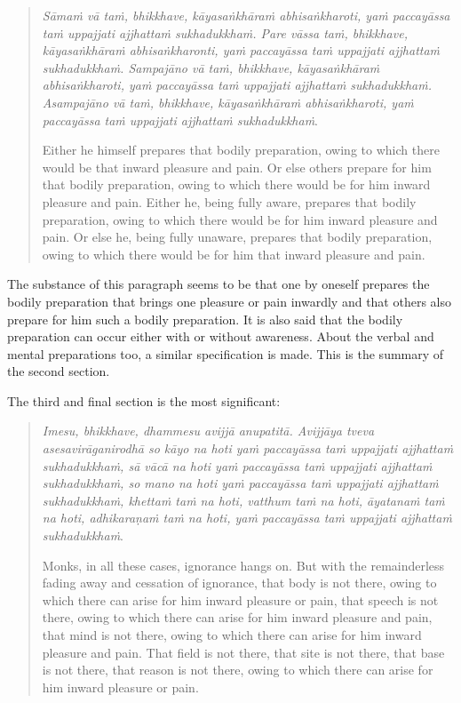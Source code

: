 \begin{quote}
\emph{Sāmaṁ vā taṁ, bhikkhave, kāyasaṅkhāraṁ abhisaṅkharoti, yaṁ paccayāssa taṁ uppajjati ajjhattaṁ sukhadukkhaṁ. Pare vāssa taṁ, bhikkhave, kāyasaṅkhāraṁ abhisaṅkharonti, yaṁ paccayāssa taṁ uppajjati ajjhattaṁ sukhadukkhaṁ. Sampajāno vā taṁ, bhikkhave, kāyasaṅkhāraṁ abhisaṅkharoti, yaṁ paccayāssa taṁ uppajjati ajjhattaṁ sukhadukkhaṁ. Asampajāno vā taṁ, bhikkhave, kāyasaṅkhāraṁ abhisaṅkharoti, yaṁ paccayāssa taṁ uppajjati ajjhattaṁ sukhadukkhaṁ}.

Either he himself prepares that bodily preparation, owing to which there would be that inward pleasure and pain. Or else others prepare for him that bodily preparation, owing to which there would be for him inward pleasure and pain. Either he, being fully aware, prepares that bodily preparation, owing to which there would be for him inward pleasure and pain. Or else he, being fully unaware, prepares that bodily preparation, owing to which there would be for him that inward pleasure and pain.
\end{quote}

The substance of this paragraph seems to be that one by oneself prepares the bodily preparation that brings one pleasure or pain inwardly and that others also prepare for him such a bodily preparation. It is also said that the bodily preparation can occur either with or without awareness. About the verbal and mental preparations too, a similar specification is made. This is the summary of the second section.

The third and final section is the most significant:

\begin{quote}
\emph{Imesu, bhikkhave, dhammesu avijjā anupatitā. Avijjāya tveva asesavirāganirodhā so kāyo na hoti yaṁ paccayāssa taṁ uppajjati ajjhattaṁ sukhadukkhaṁ, sā vācā na hoti yaṁ paccayāssa taṁ uppajjati ajjhattaṁ sukhadukkhaṁ, so mano na hoti yaṁ paccayāssa taṁ uppajjati ajjhattaṁ sukhadukkhaṁ, khettaṁ taṁ na hoti, vatthum taṁ na hoti, āyatanaṁ taṁ na hoti, adhikaraṇaṁ taṁ na hoti, yaṁ paccayāssa taṁ uppajjati ajjhattaṁ sukhadukkhaṁ}.

Monks, in all these cases, ignorance hangs on. But with the remainderless fading away and cessation of ignorance, that body is not there, owing to which there can arise for him inward pleasure or pain, that speech is not there, owing to which there can arise for him inward pleasure and pain, that mind is not there, owing to which there can arise for him inward pleasure and pain. That field is not there, that site is not there, that base is not there, that reason is not there, owing to which there can arise for him inward pleasure or pain.
\end{quote}

